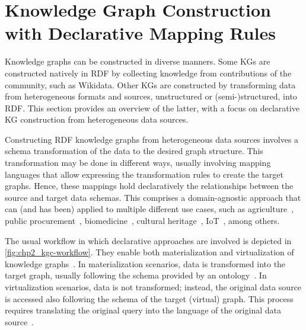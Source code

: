\section{Knowledge Graph Construction with Declarative Mapping Rules}
\label{sec:chp2_declarative_kgc}

Knowledge graphs can be constructed in diverse manners. Some KGs are constructed natively in RDF by collecting knowledge from contributions of the community, such as Wikidata. Other KGs are constructed by transforming data from heterogeneous formats and sources, unstructured or (semi-)structured, into RDF. This section provides an overview of the latter, with a focus on declarative KG construction from heterogeneous data sources.




Constructing RDF knowledge graphs from heterogeneous data sources involves a schema transformation of the data to the desired graph structure. This transformation may be done in different ways, usually involving mapping languages that allow expressing the transformation rules to create the target graphs. Hence, these mappings hold declaratively the relationships between the source and target data schemas. This comprises a domain-agnostic approach that can (and has been) applied to multiple different use cases, such as agriculture~\parencite{bilbao2022practical}, public procurement~\parencite{soylu2022theybuyforyou}, biomedicine~\parencite{iglesias2019bio2rdf,michel2020covid,aisopos2023knowledge}, cultural heritage~\parencite{calvanese2016culturalheritage}, IoT~\parencite{cimmino2020ewot,gonzalezgerpe2022extension}, among others.

The usual workflow in which declarative approaches are involved is depicted in \cref{fig:chp2_kgc-workflow}. They enable both materialization and virtualization of knowledge graphs~\parencite{Poggi2008}. In materialization scenarios, data is transformed into the target graph, usually following the schema provided by an ontology~\parencite{arenas2022morphkgc,iglesias2020rdfizer,Lefrancois2017sparqlgenerate}. In virtualization scenarios, data is not transformed; instead, the original data source is accessed also following the schema of the target (virtual) graph. This process requires translating the original query into the language of the original data source~\parencite{calvanese2017ontop,priyatna2014formalisation,rodriguez2015efficient}. 

